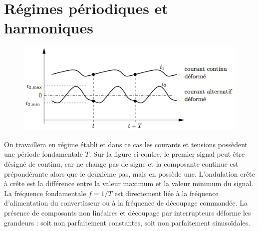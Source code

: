\section{Régimes périodiques et harmoniques}
	\begin{figure}
	\vspace{-5mm}
	\includegraphics[scale=0.25]{ch1/6}
	\end{figure}
	On travaillera en régime établi et dans ce cas les courants et tensions possèdent une période fondamentale $T$. Sur la figure ci-contre, le premier signal peut être désigné de continu, car ne change pas de signe et la composante continue est prépondérante alors que le deuxième pas, mais en possède une.
	L'ondulation crête à crête est la différence entre la valeur maximum et la valeur minimum du signal. La fréquence fondamentale $f=1/T$ est directement liée à la fréquence d'alimentation du convertisseur ou à la fréquence de découpage commandée. La présence de composants non linéaires et découpage par interrupteurs déforme les grandeurs : soit non parfaitement constantes, soit non parfaitement sinusoïdales. 
		
